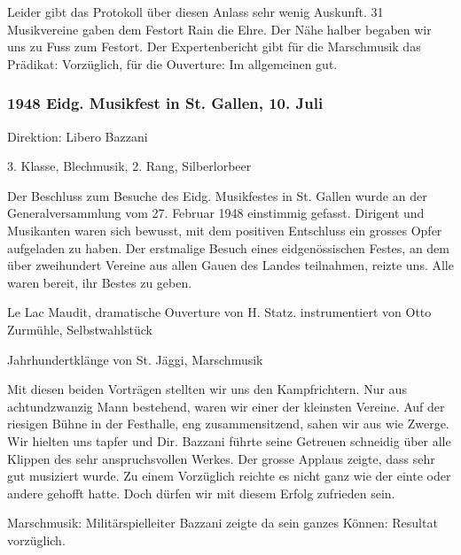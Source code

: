 \begin{history}
    Leider gibt das Protokoll über diesen Anlass sehr wenig Auskunft. 31
    Musikvereine gaben dem Festort Rain die Ehre. Der Nähe halber begaben wir
    uns zu Fuss zum Festort. Der Expertenbericht gibt für die Marschmusik das
    Prädikat: Vorzüglich, für die Ouverture: Im allgemeinen gut.


    \subsubsection{1948 Eidg. Musikfest in St. Gallen, 10. Juli}

    Direktion: Libero Bazzani

    3. Klasse, Blechmusik, 2. Rang, Silberlorbeer

    Der Beschluss zum Besuche des Eidg. Musikfestes in St. Gallen wurde an der
    Generalversammlung vom 27. Februar 1948 einstimmig gefasst. Dirigent und
    Musikanten waren sich bewusst, mit dem positiven Entschluss ein grosses
    Opfer aufgeladen zu haben. Der erstmalige Besuch eines eidgenössischen
    Festes, an dem über zweihundert Vereine aus allen Gauen des Landes
    teilnahmen, reizte uns. Alle waren bereit, ihr Bestes zu geben.

    Le Lac Maudit, dramatische Ouverture von H. Statz. instrumentiert von Otto
    Zurmühle, Selbstwahlstück

    Jahrhundertklänge von St. Jäggi, Marschmusik

    Mit diesen beiden Vorträgen stellten wir uns den Kampfrichtern. Nur aus
    achtundzwanzig Mann bestehend, waren wir einer der kleinsten Vereine. Auf
    der riesigen Bühne in der Festhalle, eng zusammensitzend, sahen wir aus wie
    Zwerge. Wir hielten uns tapfer und Dir. Bazzani führte seine Getreuen
    schneidig über alle Klippen des sehr anspruchsvollen Werkes. Der grosse
    Applaus zeigte, dass sehr gut musiziert wurde. Zu einem Vorzüglich reichte
    es nicht ganz wie der einte oder andere gehofft hatte. Doch dürfen wir mit
    diesem Erfolg zufrieden sein.

    Marschmusik: Militärspielleiter Bazzani zeigte da sein ganzes Können:
    Resultat vorzüglich.

\end{history}
